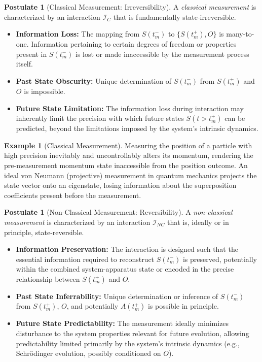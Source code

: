 \documentclass[11pt, a4paper]{article}
\theoremstyle{plain} %
\theoremstyle{definition} %
\newtheorem{postulate}[theorem]{Postulate}
\newtheorem{example}[theorem]{Example}
\theoremstyle{remark} %
\newcommand{\Interaction}{\mathcal{I}} %
\newcommand{\TimePre}{t_m^-} %
\newcommand{\TimePost}{t_m^+} %
\newcommand{\StatePre}{S(\TimePre)} %
\newcommand{\StatePost}{S(\TimePost)} %
\newcommand{\OutcomeVal}{O} %
\begin{document}
	\begin{postulate}[Classical Measurement: Irreversibility] \label{post:classical}
		A \emph{classical measurement} is characterized by an interaction $\Interaction_C$ that is fundamentally state-irreversible.
		\begin{itemize}
			\item \textbf{Information Loss:} The mapping from $\StatePre$ to $\{\StatePost, \OutcomeVal\}$ is many-to-one. Information pertaining to certain degrees of freedom or properties present in $\StatePre$ is lost or made inaccessible by the measurement process itself.
			\item \textbf{Past State Obscurity:} Unique determination of $\StatePre$ from $\StatePost$ and $\OutcomeVal$ is impossible.
			\item \textbf{Future State Limitation:} The information loss during interaction may inherently limit the precision with which future states $S(t > \TimePost)$ can be predicted, beyond the limitations imposed by the system's intrinsic dynamics.
		\end{itemize}
	\end{postulate}
	
	\begin{example}[Classical Measurement]
		Measuring the position of a particle with high precision inevitably and uncontrollably alters its momentum, rendering the pre-measurement momentum state inaccessible from the position outcome. An ideal von Neumann (projective) measurement in quantum mechanics projects the state vector onto an eigenstate, losing information about the superposition coefficients present before the measurement.
	\end{example}
	
	\begin{postulate}[Non-Classical Measurement: Reversibility] \label{post:nonclassical}
		A \emph{non-classical measurement} is characterized by an interaction $\Interaction_{NC}$ that is, ideally or in principle, state-reversible.
		\begin{itemize}
			\item \textbf{Information Preservation:} The interaction is designed such that the essential information required to reconstruct $\StatePre$ is preserved, potentially within the combined system-apparatus state or encoded in the precise relationship between $\StatePost$ and $\OutcomeVal$.
			\item \textbf{Past State Inferrability:} Unique determination or inference of $\StatePre$ from $\StatePost$, $\OutcomeVal$, and potentially $A(\TimePost)$ is possible in principle.
			\item \textbf{Future State Predictability:} The measurement ideally minimizes disturbance to the system properties relevant for future evolution, allowing predictability limited primarily by the system's intrinsic dynamics (e.g., Schr\"{o}dinger evolution, possibly conditioned on $\OutcomeVal$).
		\end{itemize}
	\end{postulate}
	
\end{document}
